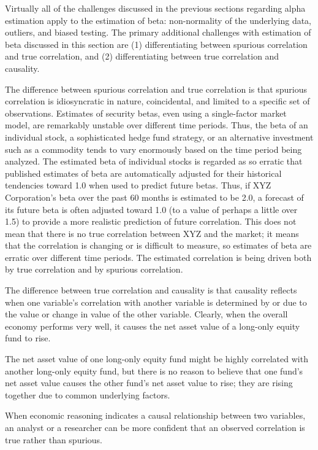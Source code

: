 \documentclass[11pt]{article}
\begin{document}
Virtually all of the challenges discussed in the previous sections regarding alpha estimation apply to the estimation of beta: non-normality of the underlying data, outliers, and biased testing. The primary additional challenges with estimation of beta discussed in this section are (1) differentiating between spurious correlation and true correlation, and (2) differentiating between true correlation and causality.

The difference between spurious correlation and true correlation is that spurious correlation is idiosyncratic in nature, coincidental, and limited to a specific set of observations. Estimates of security betas, even using a single-factor market model, are remarkably unstable over different time periods. Thus, the beta of an individual stock, a sophisticated hedge fund strategy, or an alternative investment such as a commodity tends to vary enormously based on the time period being analyzed. The estimated beta of individual stocks is regarded as so erratic that published estimates of beta are automatically adjusted for their historical tendencies toward 1.0 when used to predict future betas. Thus, if XYZ Corporation's beta over the past 60 months is estimated to be 2.0, a forecast of its future beta is often adjusted toward 1.0 (to a value of perhaps a little over 1.5) to provide a more realistic prediction of future correlation. This does not mean that there is no true correlation between XYZ and the market; it means that the correlation is changing or is difficult to measure, so estimates of beta are erratic over different time periods. The estimated correlation is being driven both by true correlation and by spurious correlation.

The difference between true correlation and causality is that causality reflects when one variable's correlation with another variable is determined by or due to the value or change in value of the other variable. Clearly, when the overall economy performs very well, it causes the net asset value of a long-only equity fund to rise.

The net asset value of one long-only equity fund might be highly correlated with another long-only equity fund, but there is no reason to believe that one fund's net asset value causes the other fund's net asset value to rise; they are rising together due to common underlying factors.

When economic reasoning indicates a causal relationship between two variables, an analyst or a researcher can be more confident that an observed correlation is true rather than spurious.
\end{document}
